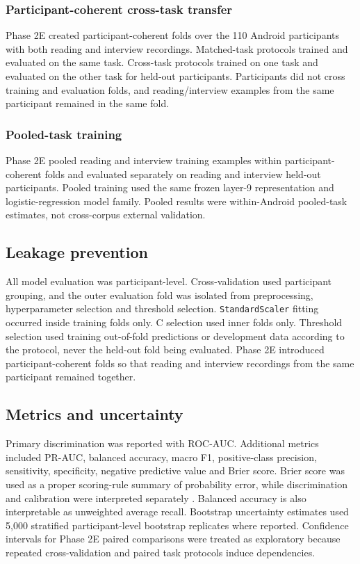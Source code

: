 \documentclass[lettersize,journal]{IEEEtran}
\begin{document}
\subsubsection{Participant-coherent cross-task transfer}

Phase 2E created participant-coherent folds over the 110 Android participants with both reading and interview recordings. Matched-task protocols trained and evaluated on the same task. Cross-task protocols trained on one task and evaluated on the other task for held-out participants. Participants did not cross training and evaluation folds, and reading/interview examples from the same participant remained in the same fold.

\subsubsection{Pooled-task training}

Phase 2E pooled reading and interview training examples within participant-coherent folds and evaluated separately on reading and interview held-out participants. Pooled training used the same frozen layer-9 representation and logistic-regression model family. Pooled results were within-Android pooled-task estimates, not cross-corpus external validation.

\subsection{Leakage prevention}

All model evaluation was participant-level. Cross-validation used participant grouping, and the outer evaluation fold was isolated from preprocessing, hyperparameter selection and threshold selection. \texttt{StandardScaler} fitting occurred inside training folds only. C selection used inner folds only. Threshold selection used training out-of-fold predictions or development data according to the protocol, never the held-out fold being evaluated. Phase 2E introduced participant-coherent folds so that reading and interview recordings from the same participant remained together.

\subsection{Metrics and uncertainty}

Primary discrimination was reported with ROC-AUC. Additional metrics included PR-AUC, balanced accuracy, macro F1, positive-class precision, sensitivity, specificity, negative predictive value and Brier score. Brier score was used as a proper scoring-rule summary of probability error, while discrimination and calibration were interpreted separately \cite{brier1950probabilityForecasts,vanCalster2019calibration}. Balanced accuracy is also interpretable as unweighted average recall. Bootstrap uncertainty estimates used 5,000 stratified participant-level bootstrap replicates where reported. Confidence intervals for Phase 2E paired comparisons were treated as exploratory because repeated cross-validation and paired task protocols induce dependencies.
\end{document}
